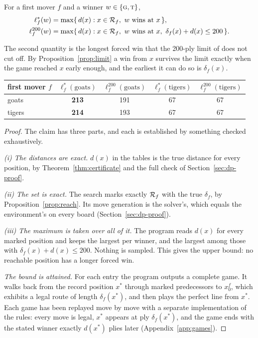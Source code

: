 \begin{definition}
For a first mover $f$ and a winner $w \in \{\textsc{g}, \textsc{t}\}$,
\begin{align*}
\ell^*_f(w) &= \max\{\, d(x) : x \in \mathcal{R}_f,\ w \text{ wins at } x \,\}, \\
\ell^{200}_f(w) &= \max\{\, d(x) : x \in \mathcal{R}_f,\ w \text{ wins at } x,\ \delta_f(x) + d(x) \le 200 \,\}.
\end{align*}
\end{definition}

The second quantity is the longest forced win that the 200-ply limit of  does not cut off. By
Proposition~\ref{prop:limit} a win from $x$ survives the limit exactly when the game reached $x$ early enough,
and the earliest it can do so is $\delta_f(x)$.

\begin{theorem}\label{thm:longest}
\begin{center}
\begin{tabular}{@{}lcccc@{}}
\toprule
first mover $f$ & $\ell^*_f(\text{goats})$ & $\ell^{200}_f(\text{goats})$ & $\ell^*_f(\text{tigers})$ & $\ell^{200}_f(\text{tigers})$ \\
\midrule
goats & \textbf{213} & 191 & 67 & 67 \\
tigers & \textbf{214} & 193 & 67 & 67 \\
\bottomrule
\end{tabular}
\end{center}
\end{theorem}

\begin{proof}
The claim has three parts, and each is established by something checked exhaustively.

\emph{(i) The distances are exact.} $d(x)$ in the tables is the true distance for every position, by
Theorem~\ref{thm:certificate} and the full check of Section~\ref{sec:dp-proof}.

\emph{(ii) The set is exact.} The search marks exactly $\mathcal{R}_f$ with the true $\delta_f$, by
Proposition~\ref{prop:reach}. Its move generation is the solver's, which equals the environment's on every
board (Section~\ref{sec:dp-proof}).

\emph{(iii) The maximum is taken over all of it.} The program reads $d(x)$ for every marked position and
keeps the largest per winner, and the largest among those with $\delta_f(x) + d(x) \le 200$. Nothing is
sampled. This gives the upper bound: no reachable position has a longer forced win.

\emph{The bound is attained.} For each entry the program outputs a complete game. It walks back from the
record position $x^*$ through marked predecessors to $x_0^f$, which exhibits a legal route of length
$\delta_f(x^*)$, and then plays the perfect line from $x^*$. Each game has been replayed move by move with a
separate implementation of the rules: every move is legal, $x^*$ appears at ply $\delta_f(x^*)$, and the game
ends with the stated winner exactly $d(x^*)$ plies later (Appendix~\ref{app:games}).
\end{proof}

